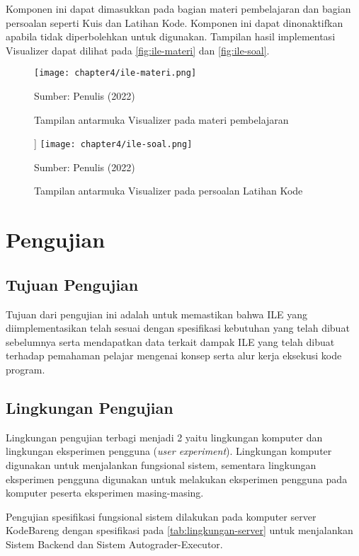 Komponen ini dapat dimasukkan pada bagian materi pembelajaran dan bagian persoalan seperti Kuis dan Latihan Kode. Komponen ini dapat dinonaktifkan apabila tidak diperbolehkan untuk digunakan. Tampilan hasil implementasi Visualizer dapat dilihat pada \autoref{fig:ile-materi} dan \autoref{fig:ile-soal}.

\begin{figure}[!h]
  \centering
  \texttt{[image: chapter4/ile-materi.png]}
  \caption{Tampilan antarmuka Visualizer pada materi pembelajaran} \label{fig:ile-materi}
  Sumber: Penulis (2022)
\end{figure}
\begin{figure}[!h]]
  \centering
  \texttt{[image: chapter4/ile-soal.png]}
  \caption{Tampilan antarmuka Visualizer pada persoalan Latihan Kode} \label{fig:ile-soal}
  Sumber: Penulis (2022)
\end{figure}

\section{Pengujian}

\subsection{Tujuan Pengujian}
Tujuan dari pengujian ini adalah untuk memastikan bahwa ILE yang diimplementasikan telah sesuai dengan spesifikasi kebutuhan yang telah dibuat sebelumnya serta mendapatkan data terkait dampak ILE yang telah dibuat terhadap pemahaman pelajar mengenai konsep serta alur kerja eksekusi kode program.

\subsection{Lingkungan Pengujian}
Lingkungan pengujian terbagi menjadi 2 yaitu lingkungan komputer dan lingkungan eksperimen pengguna (\textit{user experiment}). Lingkungan komputer digunakan untuk menjalankan fungsional sistem, sementara lingkungan eksperimen pengguna digunakan untuk melakukan eksperimen pengguna pada komputer peserta eksperimen masing-masing.

Pengujian spesifikasi fungsional sistem dilakukan pada komputer server KodeBareng dengan spesifikasi pada \autoref{tab:lingkungan-server} untuk menjalankan Sistem Backend dan Sistem Autograder-Executor.

